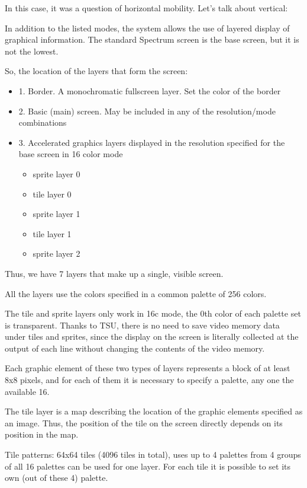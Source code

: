 In this case, it was a question of horizontal mobility. Let's talk
about vertical:

In addition to the listed modes, the system allows the use of layered
display of graphical information. The standard Spectrum screen is the
base screen, but it is not the lowest.

So, the location of the layers that form the screen: 
\begin{itemize}
\item[] 1. Border. A monochromatic fullscreen layer. Set the color of
  the border
\item[] 2. Basic (main) screen. May be included in any of the
  resolution/mode combinations
\item[] 3. Accelerated graphics layers displayed in the resolution
  specified for the base screen in 16 color mode
  \begin{itemize}
  \item sprite layer 0 
  \item tile layer 0 
  \item sprite layer 1 
  \item tile layer 1 
  \item sprite layer 2
  \end{itemize}
\end{itemize}

Thus, we have 7 layers that make up a single, visible screen.

All the layers use the colors specified in a common palette of 256
colors.

The tile and sprite layers only work in 16c mode, the 0th color of
each palette set is transparent. Thanks to TSU, there is no need to
save video memory data under tiles and sprites, since the display on
the screen is literally collected at the output of each line without
changing the contents of the video memory.

Each graphic element of these two types of layers represents a block
of at least 8x8 pixels, and for each of them it is necessary to
specify a palette, any one the available 16.

The tile layer is a map describing the location of the graphic
elements specified as an image. Thus, the position of the tile on the
screen directly depends on its position in the map.

Tile patterns: 64x64 tiles (4096 tiles in total), uses up to 4
palettes from 4 groups of all 16 palettes can be used for one
layer. For each tile it is possible to set its own (out of these 4)
palette.

